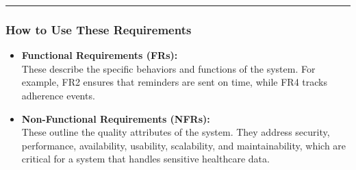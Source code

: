 \documentclass[
  12pt,
]{article}
\begin{document}
\begin{center}\rule{0.5\linewidth}{0.5pt}\end{center}

\subsubsection{How to Use These
Requirements}\label{how-to-use-these-requirements}

\begin{itemize}
\item
  \textbf{Functional Requirements (FRs):}\\
  These describe the specific behaviors and functions of the system. For
  example, FR2 ensures that reminders are sent on time, while FR4 tracks
  adherence events.
\item
  \textbf{Non-Functional Requirements (NFRs):}\\
  These outline the quality attributes of the system. They address
  security, performance, availability, usability, scalability, and
  maintainability, which are critical for a system that handles
  sensitive healthcare data.
\end{itemize}
\end{document}
